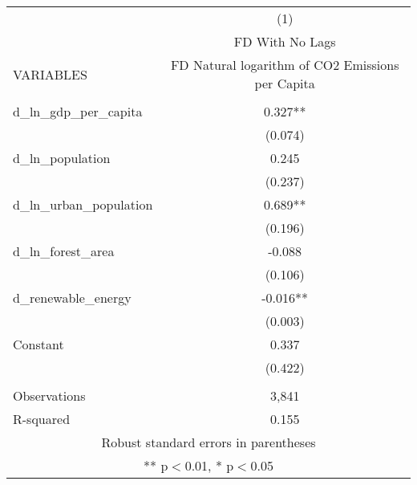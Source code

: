 \begin{tabular}{lc} \hline
 & (1) \\
 & FD With No Lags \\
VARIABLES & FD Natural logarithm of CO2 Emissions per Capita \\ \hline
 &  \\
d\_ln\_gdp\_per\_capita & 0.327** \\
 & (0.074) \\
d\_ln\_population & 0.245 \\
 & (0.237) \\
d\_ln\_urban\_population & 0.689** \\
 & (0.196) \\
d\_ln\_forest\_area & -0.088 \\
 & (0.106) \\
d\_renewable\_energy & -0.016** \\
 & (0.003) \\
Constant & 0.337 \\
 & (0.422) \\
 &  \\
Observations & 3,841 \\
 R-squared & 0.155 \\ \hline
\multicolumn{2}{c}{ Robust standard errors in parentheses} \\
\multicolumn{2}{c}{ ** p$<$0.01, * p$<$0.05} \\
\end{tabular}
